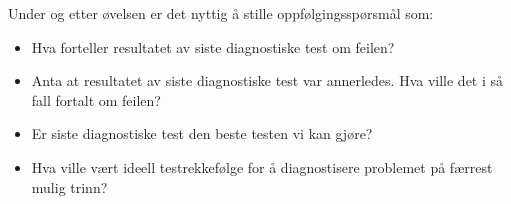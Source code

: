 Under og etter øvelsen er det nyttig å stille oppfølgingsspørsmål som:

\begin{itemize}
\item{} Hva forteller resultatet av siste diagnostiske test om feilen?
\item{} Anta at resultatet av siste diagnostiske test var annerledes.  Hva ville det i så fall fortalt om feilen?
\item{} Er siste diagnostiske test den beste testen vi kan gjøre?
\item{} Hva ville vært ideell testrekkefølge for å diagnostisere problemet på færrest mulig trinn?
\end{itemize}


